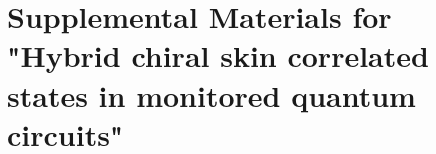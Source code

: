 \documentclass[longbibliography, aps, prx, amsmath, amssymb, amsfonts, twocolumn,superscriptaddress, footinbib]{revtex4-1}
\begin{document}
	

	\newpage
	\appendix

	\setcounter{section}{0}

    \section*{Supplemental Materials for "Hybrid chiral skin correlated states in monitored quantum circuits"}
    \setcounter{equation}{0}  %
    \setcounter{figure}{0}  %
    \renewcommand{\theequation}{S\arabic{equation}}  %
    \renewcommand{\thefigure}{S\arabic{figure}}  %
    \renewcommand{\thesubsection}{S\arabic{subsection}}  %


\end{document}
